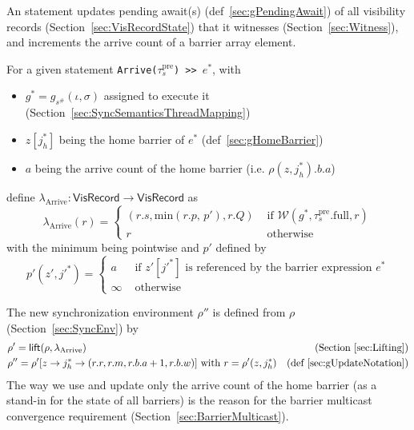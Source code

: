 

An  statement updates pending await(s) (def~\ref{sec:gPendingAwait}) of all visibility records (Section~\ref{sec:VisRecordState}) that it witnesses (Section~\ref{sec:Witness}), and increments the arrive count of a barrier array element.

For a given statement \texttt{Arrive($\tau_s^\mathrm{pre}$) >> $e^*$}, with
\begin{itemize}
  \item $g^* = g_{s^\#}(\iota, \sigma)$ assigned to execute it (Section~\ref{sec:SyncSemanticsThreadMapping})
  \item $z[j_h^*]$ being the home barrier of $e^*$ (def~\ref{sec:gHomeBarrier})
  \item $a$ being the arrive count of the home barrier (i.e. $\rho(z, j_h^*).b.a$)
\end{itemize}
define $\lambda_\mathrm{Arrive}: \mathsf{VisRecord} \to \mathsf{VisRecord}$ as
\begin{equation*}
    \lambda_\mathrm{Arrive}(r) = \begin{cases}
        (r.s, \textrm{min}(r.p,\, p'), r.Q)
        & \text{ if } \mathcal{W}(g^*, \tau_s^\mathrm{pre}.\mathrm{full}, r) \\
        r & \text{ otherwise }
    \end{cases}
\end{equation*}
with the minimum being pointwise and $p'$ defined by
\begin{equation*}
    p'(z', j'^*) = \begin{cases}
        a & \text{ if } z'[j'^*] \text{ is referenced by the barrier expression } e^* \\
        \infty & \text{ otherwise }
    \end{cases}
\end{equation*}

The new synchronization environment $\rho''$ is defined from $\rho$ (Section~\ref{sec:SyncEnv}) by
\begin{align*}
  & \rho' = \mathsf{lift}(\rho, \lambda_\mathrm{Arrive}) & \text{(Section~\ref{sec:Lifting})} \\
  & \rho'' = \rho'[z \to j_h^* \to (r.r, r.m, r.b.a + 1, r.b.w)] \text{ with } r = \rho'(z, j_h^*) & \text{(def~\ref{sec:gUpdateNotation})}
\end{align*}
The way we use and update only the arrive count of the home barrier (as a stand-in for the state of all barriers) is the reason for the barrier multicast convergence requirement (Section~\ref{sec:BarrierMulticast}).

